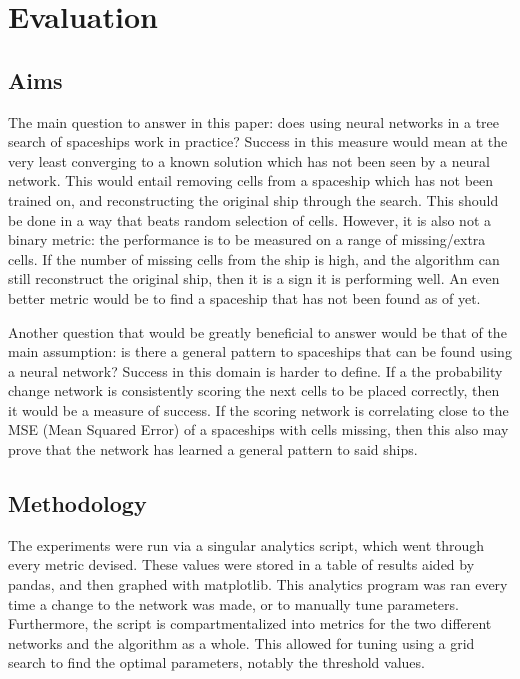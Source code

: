 \documentclass{l4proj}
\begin{document}
\chapter{Evaluation} 

\section{Aims}

The main question to answer in this paper: does using neural networks in a tree search of spaceships work in practice? Success in this measure would mean at the very least converging to a known solution which has not been seen by a neural network. This would entail removing cells from a spaceship which has not been trained on, and reconstructing the original ship through the search. This should be done in a way that beats random selection of cells. However, it is also not a binary metric: the performance is to be measured on a range of missing/extra cells. If the number of missing cells from the ship is high, and the algorithm can still reconstruct the original ship, then it is a sign it is performing well. An even better metric would be to find a spaceship that has not been found as of yet.

Another question that would be greatly beneficial to answer would be that of the main assumption: is there a general pattern to spaceships that can be found using a neural network? Success in this domain is harder to define. If a the probability change network is consistently scoring the next cells to be placed correctly, then it would be a measure of success. If the scoring network is correlating close to the MSE (Mean Squared Error) of a spaceships with cells missing, then this also may prove that the network has learned a general pattern to said ships.

\section{Methodology}

The experiments were run via a singular analytics script, which went through every metric devised. These values were stored in a table of results aided by pandas, and then graphed with matplotlib. This analytics program was ran every time a change to the network was made, or to manually tune parameters. Furthermore, the script is compartmentalized into metrics for the two different networks and the algorithm as a whole. This allowed for tuning using a grid search to find the optimal parameters, notably the threshold values.
\end{document}
